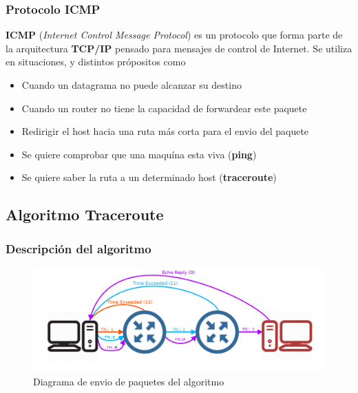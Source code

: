 \subsubsection{Protocolo \textbf{ICMP}}

\textbf{ICMP}\cite{rfc792} (\emph{Internet Control Message Protocol}) es un protocolo que
forma parte de la arquitectura \textbf{TCP/IP} pensado para mensajes de control
de Internet. Se utiliza en situaciones, y distintos própositos como

\begin{itemize}
	\item Cuando un datagrama no puede alcanzar su destino
	\item Cuando un router no tiene la capacidad de forwardear este paquete
	\item Redirigir el host hacia una ruta más corta para el envio del paquete
	\item Se quiere comprobar que una maquína esta viva (\textbf{ping})
	\item Se quiere saber la ruta a un determinado host (\textbf{traceroute})
\end{itemize}

\subsection{Algoritmo Traceroute}

\subsubsection{Descripción del algoritmo}

\begin{figure}[ht]
	\begin{center}
		\includegraphics[width=0.8\columnwidth]{imagenes/diagrama_1.jpg}
		\caption{Diagrama de envio de paquetes del algoritmo}
		\label{fig:diagramasimple}
	\end{center}
\end{figure}

